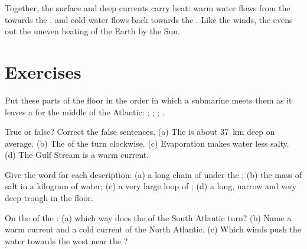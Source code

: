 Together, the surface and deep currents carry heat: warm water flows from
the  towards the , and cold water flows back towards the
. Like the winds, the  evens out the uneven heating of the
Earth by the Sun.

\section{Exercises}

\begin{exercise}[$\star$]\label{exo:g8:the-oceans:1}
Put these parts of the  floor in the order in which a submarine meets
them as it leaves a  for the middle of the Atlantic: ;
; ; .
\end{exercise}

\begin{exercise}[$\star$]\label{exo:g8:the-oceans:2}
True or false? Correct the false sentences. (a) The  is about
\qty{37}{km} deep on average. (b) The  of the 
turn clockwise. (c) Evaporation makes  water less salty. (d) The Gulf
Stream is a warm current.
\end{exercise}

\begin{exercise}[$\star$]\label{exo:g8:the-oceans:3}
Give the word for each description: (a) a long chain of  under
the ; (b) the mass of salt in a kilogram of  water; (c) a very large
loop of ; (d) a long, narrow and very deep trough in the
 floor.
\end{exercise}

\begin{exercise}[$\star$]\label{exo:g8:the-oceans:4}
On the  of the : (a) which way does the  of the South Atlantic
turn? (b) Name a warm current and a cold current of the North Atlantic.
(c) Which winds push the water towards the west near the ?
\end{exercise}


